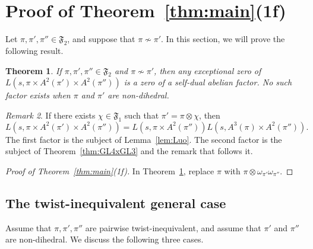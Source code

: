 \documentclass[11pt]{amsart}
\newtheorem{theorem}{Theorem}[section]
\theoremstyle{remark}
\newtheorem{remark}[theorem]{Remark}
\numberwithin{equation}{section}
\begin{document}
\section{Proof of Theorem~\ref{thm:main}(1f)}
\label{sec:1f}

Let $\pi,\pi',\pi''\in\mathfrak{F}_2$, and suppose that $\pi\not\sim\pi'$.  In this section, we will prove the following result.

\begin{theorem}
\label{thm:GL2xGL3xGL3}
If $\pi,\pi',\pi''\in\mathfrak{F}_2$ and $\pi\not\sim\pi'$, then any exceptional zero of $L(s,\pi\times A^2(\pi')\times A^2(\pi''))$ is a zero of a self-dual abelian factor.  No such factor exists when $\pi$ and $\pi'$ are non-dihedral.
\end{theorem}
\begin{remark}
If there exists $\chi\in\mathfrak{F}_1$ such that $\pi'=\pi\otimes\chi$, then
\[
L(s,\pi\times A^2(\pi')\times A^2(\pi'')) = L(s,\pi\times A^2(\pi'')) L(s,A^3(\pi)\times A^2(\pi'')).
\]
The first factor is the subject of Lemma~\ref{lem:Luo}.  The second factor is the subject of Theorem~\ref{thm:GL4xGL3} and the remark that follows it.
\end{remark}


\begin{proof}[Proof of Theorem~\ref{thm:main}(1f)]
In Theorem~\ref{thm:GL2xGL3xGL3}, replace $\pi$ with $\pi\otimes\omega_{\pi'}\omega_{\pi''}$.
\end{proof}

\subsection{The twist-inequivalent general case}
Assume that $\pi,\pi',\pi''$ are pairwise twist-inequivalent, and assume that $\pi'$ and $\pi''$ are non-dihedral. We discuss the following three cases.
\end{document}
